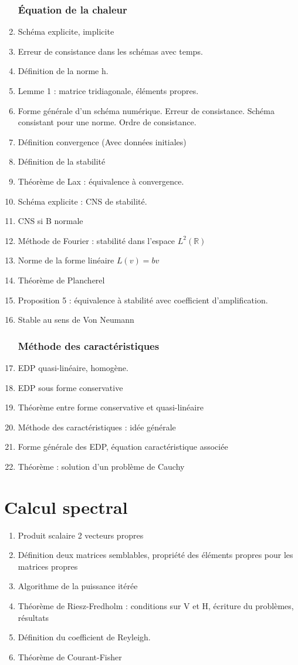 \documentclass[11pt, twocolumn, landscape]{article}
\begin{document}
\begin{enumerate}
\section{Équation de la chaleur}
\item Schéma explicite, implicite
\item Erreur de consistance dans les schémas avec temps. 
\item Définition de la norme h. 
\item Lemme 1 : matrice tridiagonale, éléments propres. 
\item Forme générale d'un schéma numérique. Erreur de consistance. Schéma consistant pour une norme. Ordre de consistance.
\item Définition convergence (Avec données initiales)
\item Définition de la stabilité
\item Théorème de Lax : équivalence à convergence.
\item Schéma explicite : CNS de stabilité.
\item CNS si B normale
\item Méthode de Fourier : stabilité dans l'espace $L^2(\mathbb{R})$
\item Norme de la forme linéaire $L(v)=bv$
\item Théorème de Plancherel
\item Proposition 5 : équivalence à stabilité avec coefficient d'amplification.
\item Stable au sens de Von Neumann
\section{Méthode des caractéristiques}
\item EDP quasi-linéaire, homogène.
\item EDP sous forme conservative
\item Théorème entre forme conservative et quasi-linéaire
\item Méthode des caractéristiques : idée générale
\item Forme générale des EDP, équation caractéristique associée
\item Théorème : solution d'un problème de Cauchy
\end{enumerate}

\part{Calcul spectral}
\begin{enumerate}
\item Produit scalaire 2 vecteurs propres
\item Définition deux matrices semblables, propriété des éléments propres pour les matrices propres
\item Algorithme de la puissance itérée
\item Théorème de Riesz-Fredholm : conditions sur V et H, écriture du problèmes, résultats
\item Définition du coefficient de Reyleigh.
\item Théorème de Courant-Fisher
\end{enumerate}
\end{document}
